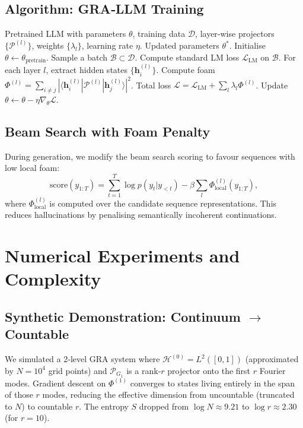 \documentclass[11pt]{article}
\newcommand{\cP}{\mathcal{P}}
\newcommand{\cH}{\mathcal{H}}
\begin{document}
\subsection{Algorithm: GRA‑LLM Training}
\begin{algorithm}[H]
\caption{GRA‑Regularised LLM Fine‑Tuning}
\label{alg:gra_llm}
\begin{algorithmic}[1]
\REQUIRE Pretrained LLM with parameters $\theta$, training data $\mathcal{D}$, layer‑wise projectors $\{\cP^{(l)}\}$, weights $\{\lambda_l\}$, learning rate $\eta$.
\ENSURE Updated parameters $\theta^*$.
\STATE Initialise $\theta \leftarrow \theta_{\text{pretrain}}$.
    \STATE Sample a batch $\mathcal{B} \subset \mathcal{D}$.
    \STATE Compute standard LM loss $\mathcal{L}_{\text{LM}}$ on $\mathcal{B}$.
    \STATE For each layer $l$, extract hidden states $\{\mathbf{h}_i^{(l)}\}$.
    \STATE Compute foam $\Phi^{(l)} = \sum_{i \neq j} |\langle \mathbf{h}_i^{(l)} | \cP^{(l)} | \mathbf{h}_j^{(l)}\rangle|^2$.
    \STATE Total loss $\mathcal{L} = \mathcal{L}_{\text{LM}} + \sum_l \lambda_l \Phi^{(l)}$.
    \STATE Update $\theta \leftarrow \theta - \eta \nabla_\theta \mathcal{L}$.
\ENDWHILE
\end{algorithmic}
\end{algorithm}

\subsection{Beam Search with Foam Penalty}
During generation, we modify the beam search scoring to favour sequences with low local foam:
\[
\text{score}(y_{1:T}) = \sum_{t=1}^T \log p(y_t | y_{<t}) - \beta \sum_{l} \Phi^{(l)}_{\text{local}}(y_{1:T}),
\]
where $\Phi^{(l)}_{\text{local}}$ is computed over the candidate sequence representations. This reduces hallucinations by penalising semantically incoherent continuations.

\section{Numerical Experiments and Complexity}
\label{sec:experiments}

\subsection{Synthetic Demonstration: Continuum $\to$ Countable}
We simulated a 2‑level GRA system where $\cH^{(0)} = L^2([0,1])$ (approximated by $N=10^4$ grid points) and $\cP_{G_1}$ is a rank‑$r$ projector onto the first $r$ Fourier modes. Gradient descent on $\Phi^{(1)}$ converges to states living entirely in the span of those $r$ modes, reducing the effective dimension from uncountable (truncated to $N$) to countable $r$. The entropy $S$ dropped from $\log N \approx 9.21$ to $\log r \approx 2.30$ (for $r=10$).
\end{document}
